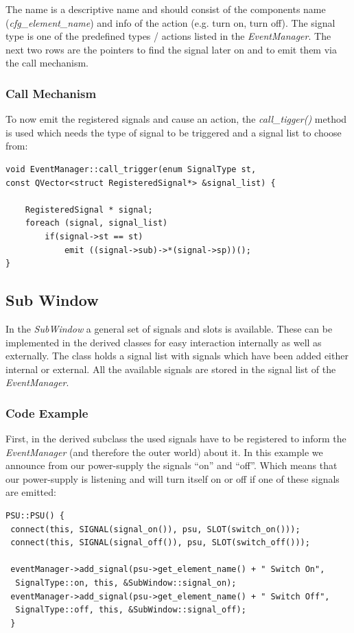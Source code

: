 \documentclass[10pt,a4paper]{article}
\begin{document}
			The name is a descriptive name and should consist of the components name (\textit{cfg\_element\_name}) and info of the action (e.g. turn on, turn off). The signal type is one of the predefined types / actions listed in the \textit{EventManager}. The next two rows are the pointers to find the signal later on and to emit them via the call mechanism.

		\subsubsection{Call Mechanism}
		
		To now emit the registered signals and cause an action, the \textit{call\_tigger()} method is used which needs the type of signal to be triggered and a signal list to choose from:
		
\begin{lstlisting}[caption=EventManager.cpp]
void EventManager::call_trigger(enum SignalType st,
const QVector<struct RegisteredSignal*> &signal_list) {

    RegisteredSignal * signal;
    foreach (signal, signal_list)
        if(signal->st == st)
            emit ((signal->sub)->*(signal->sp))();
}
\end{lstlisting}

	\subsection{Sub Window}
	
	In the \textit{SubWindow} a general set of signals and slots is available. These can be implemented in the derived classes for easy interaction internally as well as externally. The class holds a signal list with signals which have been added either internal or external. All the available signals are stored in the signal list of the \textit{EventManager}.

		\subsubsection{Code Example}

		First, in the derived subclass the used signals have to be registered to inform the \textit{EventManager} (and therefore the outer world) about it. In this example we announce from our power-supply the signals \enquote{on} and \enquote{off}. Which means that our power-supply is listening and will turn itself on or off if one of these signals are emitted:
		
\begin{lstlisting}[caption=PSU.cpp]
PSU::PSU() {
 connect(this, SIGNAL(signal_on()), psu, SLOT(switch_on()));
 connect(this, SIGNAL(signal_off()), psu, SLOT(switch_off()));

 eventManager->add_signal(psu->get_element_name() + " Switch On",
  SignalType::on, this, &SubWindow::signal_on);
 eventManager->add_signal(psu->get_element_name() + " Switch Off",
  SignalType::off, this, &SubWindow::signal_off);
 }
\end{lstlisting}
\end{document}
